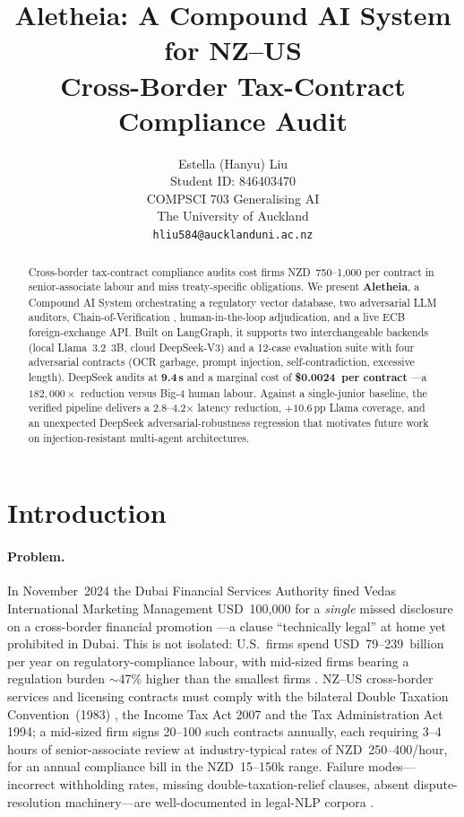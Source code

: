 \documentclass{article}
\title{Aletheia: A Compound AI System for NZ--US\\ Cross-Border Tax-Contract Compliance Audit}
\author{%
Estella (Hanyu) Liu \\
Student ID: 846403470 \\
COMPSCI 703 Generalising AI \\
The University of Auckland \\
\texttt{hliu584@aucklanduni.ac.nz} \\
}
\begin{document}
\maketitle

\begin{abstract}
Cross-border tax-contract compliance audits cost firms NZD~750--1{,}000
per contract in senior-associate labour and miss treaty-specific
obligations. We present \textbf{Aletheia}, a Compound AI System
orchestrating a regulatory vector database, two adversarial LLM
auditors, Chain-of-Verification \cite{dhuliawala2023chain},
human-in-the-loop adjudication, and a live ECB foreign-exchange API.
Built on LangGraph, it supports two interchangeable backends
(local Llama~3.2~3B, cloud DeepSeek-V3) and a 12-case evaluation suite
with four adversarial contracts (OCR garbage, prompt injection,
self-contradiction, excessive length). DeepSeek audits at
\textbf{9.4\,s} and a marginal cost of \textbf{\$0.0024~per contract}
---a $182{,}000\times$ reduction versus Big-4 human labour. Against
a single-junior baseline, the verified pipeline delivers a
2.8--4.2$\times$ latency reduction, $+10.6$\,pp Llama coverage, and an
unexpected DeepSeek adversarial-robustness regression that motivates
future work on injection-resistant multi-agent architectures.
\end{abstract}

\section{Introduction}

\paragraph{Problem.} In November~2024 the Dubai Financial Services Authority
fined Vedas International Marketing Management USD~100{,}000 for a
\emph{single} missed disclosure on a cross-border financial promotion
\cite{dfsa2024vedas}---a clause ``technically legal'' at home yet
prohibited in Dubai. This is not isolated: U.S.~firms spend
USD~79--239~billion per year on regulatory-compliance labour, with
mid-sized firms bearing a regulation burden $\sim$47\% higher than the
smallest firms \cite{trebbi2024catocost}.
NZ--US cross-border services and licensing contracts must comply with
the bilateral Double Taxation Convention~(1983) \cite{nzus1983treaty},
the Income Tax Act 2007 and the Tax Administration Act 1994; a
mid-sized firm signs 20--100 such contracts annually, each requiring
3--4 hours of senior-associate review at industry-typical rates of
NZD~250--400/hour, for an annual compliance bill in the
NZD~15--150k range. Failure modes---incorrect withholding rates,
missing double-taxation-relief clauses, absent dispute-resolution
machinery---are well-documented in legal-NLP corpora
\cite{chalkidis2022legaltech, katz2023legalNLP}.
\end{document}
